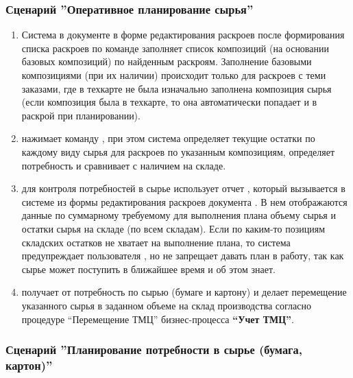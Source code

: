 \subsubsection{Сценарий ''Оперативное планирование сырья''}
\label{bp:plan_7}


\begin{enumerate}


\item	Система \gofro в документе  в форме редактирования раскроев после формирования списка раскроев \planner по команде  заполняет список композиций (на основании базовых композиций)  по найденным раскроям. Заполнение базовыми композициями (при их наличии) происходит только для раскроев с теми заказами, где в техкарте не была изначально заполнена композиция сырья (если композиция была в техкарте, то она автоматически попадает и в раскрой при планировании). 
\item \planner нажимает команду , при этом система \gofro определяет текущие остатки по каждому виду сырья для раскроев по указанным композициям, определяет потребность и сравнивает с наличием на складе.
\item \planner для контроля потребностей в сырье использует отчет , который вызывается в системе \gofro из формы редактирования раскроев документа . В нем отображаются данные по суммарному требуемому для выполнения плана объему сырья и остатки сырья на складе (по всем складам). Если по каким-то позициям складских остатков не хватает на выполнение плана, то система \gofro предупреждает пользователя \planner, но не запрещает давать план в работу, так как сырье может поступить в ближайшее время и \planner об этом знает.
\item \kladovshik получает от \planner потребность по сырью (бумаге и картону) и делает перемещение указанного сырья в заданном объеме на склад производства согласно процедуре “Перемещение ТМЦ” бизнес-процесса \textbf{“Учет ТМЦ”}. 
\end{enumerate}


\subsubsection{Сценарий ''Планирование потребности в сырье (бумага, картон)''}
\label{bp:plan_8}


